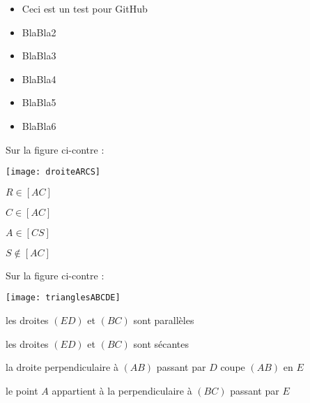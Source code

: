 \begin{acquis}
\begin{itemize}
\item Ceci est un test pour GitHub
\item BlaBla2
\item BlaBla3
\item BlaBla4
\item BlaBla5
\item BlaBla6
\end{itemize}
\end{acquis} %


\begin{QCM}
  \begin{GroupeQCM}
    \begin{exercice}
     Sur la figure ci-contre : \vspace{-2em} \begin{center} \texttt{[image: droiteARCS]} \end{center} \vspace{-1em}
      \begin{ChoixQCM}{4}
      \item $R \in [AC]$
      \item $C \in [AC]$
      \item $A \in [CS]$
      \item $S \notin [AC]$
      \end{ChoixQCM}
\begin{corrige}
   \end{corrige}
    \end{exercice}
 
    
    \begin{exercice}
     Sur la figure ci-contre : \vspace{-2em}\begin{center}\texttt{[image: trianglesABCDE]}\end{center}\vspace{-1em}
      \begin{ChoixQCM}{4}
      \item les droites $(ED)$ et $(BC)$ sont parallèles
      \item les droites $(ED)$ et $(BC)$ sont sécantes
      \item la droite perpendiculaire à $(AB)$ passant par $D$ coupe $(AB)$ en $E$
      \item le point $A$ appartient à la  perpendiculaire à $(BC)$ passant par $E$
      \end{ChoixQCM}
\begin{corrige}
   \end{corrige}
    \end{exercice}



\end{GroupeQCM}
\end{QCM}
